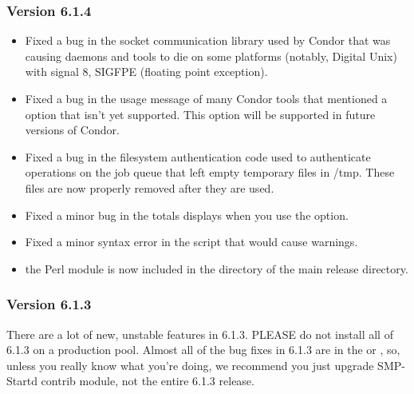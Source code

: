 \subsubsection{\label{sec:New-6-1-4}Version 6.1.4}

\begin{itemize}

\item Fixed a bug in the socket communication library used by Condor
that was causing daemons and tools to die on some platforms (notably,
Digital Unix) with signal 8, SIGFPE (floating point exception).

\item Fixed a bug in the usage message of many Condor tools that
mentioned a  option that isn't yet supported. 
This option will be supported in future versions of Condor.

\item Fixed a bug in the filesystem authentication code used to
authenticate operations on the job queue that left empty temporary
files in /tmp.  
These files are now properly removed after they are used.

\item Fixed a minor bug in the totals  displays when
you use the  option.

\item Fixed a minor syntax error in the  script that
would cause warnings.

\item the  Perl module is now included in the
 directory of the main release directory.

\end{itemize}

\subsubsection{\label{sec:New-6-1-3}Version 6.1.3}

\Note There are a lot of new, unstable features in 6.1.3.  
PLEASE do not install all of 6.1.3 on a production pool.
Almost all of the bug fixes in 6.1.3 are in the  or
, so, unless you really know what you're doing, we
recommend you just upgrade SMP-Startd contrib module, not the entire
6.1.3 release. 

